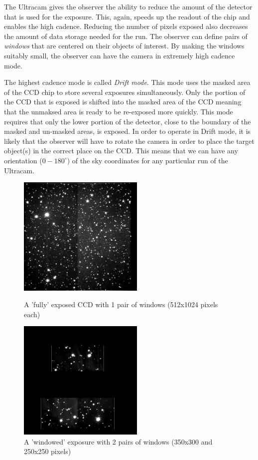 \documentclass[a4paper,10pt]{article}
\begin{document}
The Ultracam gives the observer the ability to reduce the amount of the detector that is used for the exposure. This, again, speeds up the readout of the chip and enables the high cadence. Reducing the number of pixels exposed also decreases the amount of data storage needed for the run. The observer can define pairs of \emph{windows} that are centered on their objects of interest. By making the windows suitably small, the observer can have the camera in extremely high cadence mode. 

The highest cadence mode is called \emph{Drift mode}. This mode uses the masked area of the CCD chip to store several exposures simultaneously. Only the portion of the CCD that is exposed is shifted into the masked area of the CCD meaning that the unmaksed area is ready to be re-exposed more quickly. This mode requires that only the lower portion of the detector, close to the boundary of the masked and un-masked areas, is exposed. In order to operate in Drift mode, it is likely that the observer will have to rotate the camera in order to place the target object(s) in the correct place on the CCD. This means that we can have any orientation ($0-180^{\circ}$) of the sky coordinates for any particular run of the Ultracam.   

\begin{figure}
\centering
\begin{minipage}{.5\textwidth}
  \centering
  \includegraphics[width=60mm]{images/run010_r.png}
  \caption{A 'fully' exposed CCD with 1 pair of windows (512x1024 pixels each)}
  \label{fig:KOI-824}
\end{minipage}%
\begin{minipage}{.5\textwidth}
  \centering
  \includegraphics[width=60mm]{images/run016_r.png}
  \caption{A 'windowed' exposure with 2 pairs of windows (350x300 and 250x250 pixels)}
  \label{fig:test2}
\end{minipage}
\end{figure}
\end{document}
